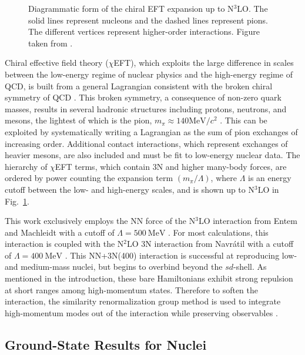 \documentclass[thesis.tex]{subfiles}
\begin{document}
\begin{figure}[h]
  \centering
  \caption{Diagrammatic form of the chiral EFT expansion up to N$^{3}$LO.  The solid lines represent nucleons and the dashed lines represent pions.  The different vertices represent higher-order interactions.  Figure taken from  \cite{MACHLEIDT2016}.}  
  \label{fig:Chiral_Forces}
\end{figure}

Chiral effective field theory ($\chi$EFT), which exploits the large difference in scales between the low-energy regime of nuclear physics and the high-energy regime of QCD, is built from a general Lagrangian consistent with the broken chiral symmetry of QCD \cite{EPELBAUM20091773,MACHLEIDT2016}.  This broken symmetry, a consequence of non-zero quark masses, results in several hadronic structures including protons, neutrons, and mesons, the lightest of which is the pion, $m_{\pi}\approx 140\mathrm{MeV}/c^{2}$ \cite{BERINGER2012}.  This can be exploited by systematically writing a Lagrangian as the sum of pion exchanges of increasing order.  Additional contact interactions, which represent exchanges of heavier mesons, are also included and must be fit to low-energy nuclear data.  The hierarchy of $\chi$EFT terms, which contain 3N and higher many-body forces, are ordered by power counting the expansion term $(m_{\pi}/\Lambda)$, where $\Lambda$ is an energy cutoff between the low- and high-energy scales, and is shown up to N$^{3}$LO in Fig.\ \ref{fig:Chiral_Forces}.

This work exclusively employs the NN force of the N$^{3}$LO interaction from Entem and Machleidt with a cutoff of $\Lambda=500\ \mathrm{MeV}$ \cite{ENTEM2003}.  For most calculations, this interaction is coupled with the N$^{2}$LO 3N interaction from Navr\'{a}til with a cutoff of $\Lambda=400\ \mathrm{MeV}$ \cite{NAVRATIL2007}.  This NN+3N(400) interaction is successful at reproducing low- and medium-mass nuclei, but begins to overbind beyond the $sd$-shell.  As mentioned in the introduction, these bare Hamiltonians exhibit strong repulsion at short ranges among high-momentum states.  Therefore to soften the interaction, the similarity renormalization group method is used to integrate high-momentum modes out of the interaction while preserving observables \cite{BOGNER201094,ROTH2011072501}.


\subsection{Ground-State Results for Nuclei} \label{section:nuclear_results}
\end{document}
